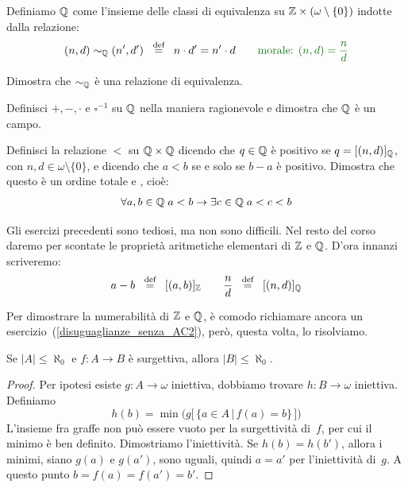 \begin{definition}[$\QQ$]
	Definiamo $\QQ$ come l'insieme delle classi di equivalenza su $\mathbb Z \times (\omega\setminus\{0\})$ indotte dalla relazione:
	\[ (n,d) \sim_\QQ (n',d') \;\;\Mydef\;\; n \cdot d' = n' \cdot d
\qquad \text{\drkgrn morale: $(n,d) = \frac nd$}
		\]
\end{definition}

\begin{exercise}
	Dimostra che $\sim_\mathbb Q$ \`e una relazione di equivalenza.
\end{exercise}

\begin{exercise}
	Definisci $+,-,\cdot$ e $\square^{-1}$ su $\QQ$ nella maniera ragionevole e dimostra che $\QQ$ \`e un campo.
\end{exercise}

\begin{exercise}[Ordine di $\QQ$]
	Definisci la relazione $<$ su $\mathbb Q \times \mathbb Q$ dicendo che $q \in \mathbb Q$ \`e positivo se $q = [(n,d)]_\mathbb Q$, con $n,d \in \omega\setminus\{0\}$, e dicendo che $a < b$ se e solo se $b - a$ \`e positivo.
	Dimostra che questo \`e un ordine totale e , cio\`e:
	\[ \forall {a,b \in \mathbb Q} \; a < b \rightarrow \exists {c \in \mathbb Q} \; a< c <b
		\]
\end{exercise}

\begin{note}
	Gli esercizi precedenti sono tediosi, ma non sono difficili. Nel resto del corso daremo per scontate le propriet\`a aritmetiche elementari di $\mathbb Z$ e $\QQ$.
	D'ora innanzi scriveremo:
	\[ a - b \;\;\overset{\text{def}}{=}\;\; [(a,b)]_{\mathbb Z} \qquad \frac{n}{d}
\;\;\overset{\text{def}}{=}\;\; [(n,d)]_\mathbb Q
		\]
\end{note}

Per dimostrare la numerabilit\`a di $\mathbb Z$ e $\QQ$, \`e comodo richiamare
ancora un esercizio~(\ref{disuguaglianze_senza_AC2}), per\`o, questa
volta, lo risolviamo.

\begin{lemma}
	Se $|A| \leq \aleph_0$ e $f\colon A \to B$ \`e surgettiva, allora $|B| \leq \aleph_0$.
\end{lemma}

\begin{proof}
Per ipotesi esiste $g\colon A\to\omega$ iniettiva, dobbiamo trovare 
$h\colon B \to \omega$ iniettiva. Definiamo
        \[ h(b) = \min\big(g\big[\,\{a\in A\,|\,f(a)=b\}\,\big]\big)
                \]
        L'insieme fra graffe non pu\`o essere vuoto per la surgettivit\`a
di~$f$, per cui il minimo \`e ben definito.
        Dimostriamo l'iniettivit\`a. Se $h(b) = h(b')$, allora i minimi,
siano $g(a)$ e $g(a')$, sono uguali, quindi $a=a'$ per l'iniettivit\`a
di~$g$. A questo punto $b=f(a)=f(a')=b'$.
\end{proof}


